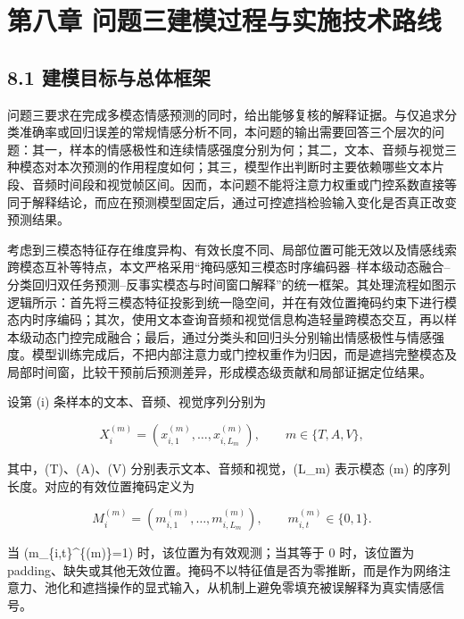 \documentclass[
  12pt,
  a4paper,
]{ctexart}
\author{}
\date{}
\begin{document}
\hypertarget{ux7b2cux516bux7ae0-ux95eeux9898ux4e09ux5efaux6a21ux8fc7ux7a0bux4e0eux5b9eux65bdux6280ux672fux8defux7ebf}{%
\section{第八章
问题三建模过程与实施技术路线}\label{ux7b2cux516bux7ae0-ux95eeux9898ux4e09ux5efaux6a21ux8fc7ux7a0bux4e0eux5b9eux65bdux6280ux672fux8defux7ebf}}

\hypertarget{ux5efaux6a21ux76eeux6807ux4e0eux603bux4f53ux6846ux67b6}{%
\subsection{8.1
建模目标与总体框架}\label{ux5efaux6a21ux76eeux6807ux4e0eux603bux4f53ux6846ux67b6}}

问题三要求在完成多模态情感预测的同时，给出能够复核的解释证据。与仅追求分类准确率或回归误差的常规情感分析不同，本问题的输出需要回答三个层次的问题：其一，样本的情感极性和连续情感强度分别为何；其二，文本、音频与视觉三种模态对本次预测的作用程度如何；其三，模型作出判断时主要依赖哪些文本片段、音频时间段和视觉帧区间。因而，本问题不能将注意力权重或门控系数直接等同于解释结论，而应在预测模型固定后，通过可控遮挡检验输入变化是否真正改变预测结果。

考虑到三模态特征存在维度异构、有效长度不同、局部位置可能无效以及情感线索跨模态互补等特点，本文严格采用``掩码感知三模态时序编码器--样本级动态融合--分类回归双任务预测--反事实模态与时间窗口解释''的统一框架。其处理流程如图示逻辑所示：首先将三模态特征投影到统一隐空间，并在有效位置掩码约束下进行模态内时序编码；其次，使用文本查询音频和视觉信息构造轻量跨模态交互，再以样本级动态门控完成融合；最后，通过分类头和回归头分别输出情感极性与情感强度。模型训练完成后，不把内部注意力或门控权重作为归因，而是遮挡完整模态及局部时间窗，比较干预前后预测差异，形成模态级贡献和局部证据定位结果。

设第 (i) 条样本的文本、音频、视觉序列分别为

\[
X_i^{(m)}=(x_{i,1}^{(m)},\ldots,x_{i,L_m}^{(m)}),
\qquad m\in\{T,A,V\},
\]

其中，(T)、(A)、(V) 分别表示文本、音频和视觉，(L\_m) 表示模态 (m)
的序列长度。对应的有效位置掩码定义为

\[
M_i^{(m)}=(m_{i,1}^{(m)},\ldots,m_{i,L_m}^{(m)}),
\qquad m_{i,t}^{(m)}\in\{0,1\}.
\]

当 (m\_\{i,t\}\^{}\{(m)\}=1) 时，该位置为有效观测；当其等于 0
时，该位置为
padding、缺失或其他无效位置。掩码不以特征值是否为零推断，而是作为网络注意力、池化和遮挡操作的显式输入，从机制上避免零填充被误解释为真实情感信号。
\end{document}
